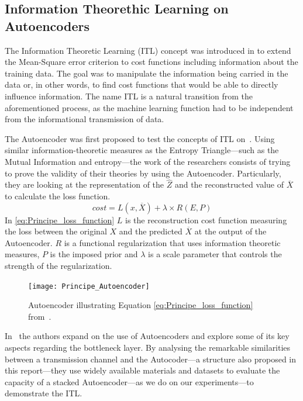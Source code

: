 \subsection{Information Theorethic Learning on Autoencoders}

The Information Theoretic Learning (ITL) concept was introduced in \cite{Principe_2000} to extend the Mean-Square error criterion to cost functions including information about the training data. The goal was to manipulate the information being carried in the data or, in other words, to find cost functions that would be able to directly influence information. The name ITL is a natural transition from the aforementioned process, as the machine learning function had to be independent from the informational transmission of data. 

The Autoencoder was first proposed to test the concepts of ITL on~\cite{Santana_2016}. Using similar information-theoretic measures as the Entropy Triangle---such as the Mutual Information and entropy---the work of the researchers consists of trying to prove the validity of their theories by using the Autoencoder. Particularly, they are looking at the representation of the $\hat{Z}$ and the reconstructed value of $\overline{X}$ to calculate the loss function.
\begin{equation}
\label{eq:Principe_loss_function}
cost = L(x,\overline{X}) + \lambda \times R(E,P)
\end{equation}
In \eqref{eq:Principe_loss_function} $L$ is the reconstruction cost function measuring the loss between the original $X$ and the predicted $\overline{X}$ at the output of the Autoencoder. $R$ is a functional regularization that uses information theoretic measures, $P$ is the imposed prior and $\lambda$ is a scale parameter that controls the strength of the regularization.

\begin{figure}[H]
	\centering	
	\texttt{[image: Principe\_Autoencoder]}
	\caption{Autoencoder illustrating Equation \ref{eq:Principe_loss_function} from~\protect\cite{Santana_2016}.}
	\label{fig:figure_autoencoder2}
\end{figure} 

In~\cite{Yu_2019} the authors expand on the use of Autoencoders and explore some of its key aspects regarding the bottleneck layer. By analysing the remarkable similarities between a transmission channel and the Autocoder---a structure also proposed in this report---they use widely available materials and datasets to evaluate the capacity of a stacked Autoencoder---as we do on our experiments---to demonstrate the ITL. 



